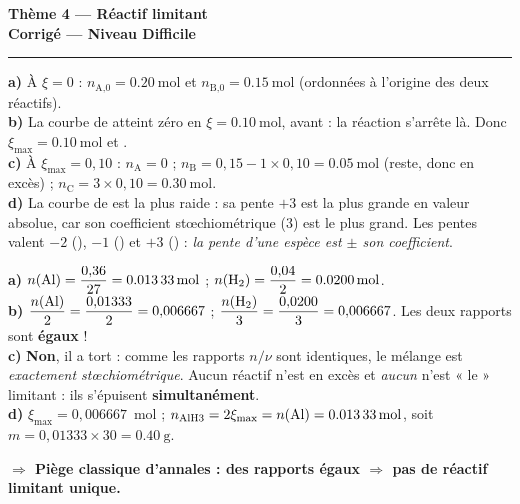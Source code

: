 \documentclass[11pt,a4paper]{article}
\newcommand{\nq}[1]{n_{\text{#1}}}
\newcommand{\rep}[1]{\par\smallskip\noindent\textbf{\color{corrcol}$\Rightarrow$ #1}}
\begin{document}
\begin{center}
{\LARGE\bfseries\color{primarydark}Thème 4 — Réactif limitant}\\[1pt]
{\large\color{corrcol}\textbf{Corrigé — Niveau Difficile}}\\
{\color{primary}\rule{0.6\linewidth}{1pt}}
\end{center}

\begin{cor}
\textbf{a)} À $\xi=0$ : $\nq{A,0}=\SI{0,20}{\mole}$ et $\nq{B,0}=\SI{0,15}{\mole}$
(ordonnées à l'origine des deux réactifs).\\
\textbf{b)} La courbe de  atteint zéro en $\xi=\SI{0,10}{\mole}$, avant  : la réaction
s'arrête là. Donc $\xi_{\max}=\SI{0,10}{\mole}$ et .\\
\textbf{c)} À $\xi_{\max}=0{,}10$ : $\nq{A}=0$ ; $\nq{B}=0{,}15-1\times0{,}10=\SI{0,05}{\mole}$
(reste, donc  en excès) ; $\nq{C}=3\times0{,}10=\SI{0,30}{\mole}$.\\
\textbf{d)} La courbe de  est la plus raide : sa pente $+3$ est la plus grande en valeur absolue,
car son coefficient stœchiométrique (3) est le plus grand. Les pentes valent $-2$ (),
$-1$ () et $+3$ () : \emph{la pente d'une espèce est $\pm$ son coefficient}.
\end{cor}

\begin{cor}
\textbf{a)} $n(\ce{Al})=\dfrac{0{,}36}{27}=\SI{0,01333}{\mole}$ ;
$n(\ce{H2})=\dfrac{0{,}04}{2}=\SI{0,0200}{\mole}$.\\
\textbf{b)} $\dfrac{n(\ce{Al})}{2}=\dfrac{0{,}01333}{2}=0{,}006667$ ;
$\dfrac{n(\ce{H2})}{3}=\dfrac{0{,}0200}{3}=0{,}006667$. Les deux rapports sont \textbf{égaux} !\\
\textbf{c)} \textbf{Non}, il a tort : comme les rapports $n/\nu$ sont identiques, le mélange est
\emph{exactement stœchiométrique}. Aucun réactif n'est en excès et \emph{aucun} n'est « le »
limitant : ils s'épuisent \textbf{simultanément}.\\
\textbf{d)} $\xi_{\max}=0{,}006667$~mol ; $\nq{AlH3}=2\xi_{\max}=n(\ce{Al})=\SI{0,01333}{\mole}$, soit
$m=0{,}01333\times30=\boxed{\SI{0,40}{\gram}}$.
\rep{Piège classique d'annales : des rapports égaux $\Rightarrow$ pas de réactif limitant unique.}
\end{cor}
\end{document}
